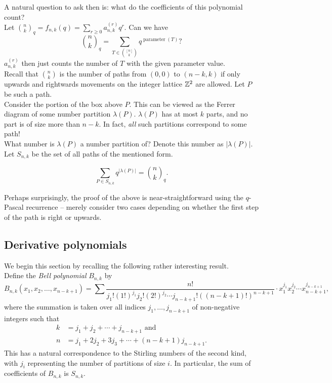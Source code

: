 	A natural question to ask then is: what do the coefficients of this polynomial count?\\
	Let $\binom{n}{k}_q = f_{n,k}(q) = \sum_{r \ge 0} a_{n,k}^{(r)} q^r$.
	Can we have
	\[ \binom{n}{k}_q = \sum_{T \in \binom{[n]}{k}} q^{\operatorname{parameter}(T)}? \]
	$a_{n,k}^{(r)}$ then just counts the number of $T$ with the given parameter value.\\
	Recall that $\binom{n}{k}$ is the number of paths from $(0,0)$ to $(n-k,k)$ if only upwards and rightwards movements on the integer lattice $\mathbb{Z}^2$ are allowed. Let $P$ be such a path.\\
	Consider the portion of the box above $P$. This can be viewed as the Ferrer diagram of some number partition $\lambda(P)$. $\lambda(P)$ has at most $k$ parts, and no part is of size more than $n-k$. In fact, \emph{all} such partitions correspond to some path!\\
	What number is $\lambda(P)$ a number partition of? Denote this number as $|\lambda(P)|$. Let $S_{n,k}$ be the set of all paths of the mentioned form. 

	\begin{ftheo}
		\[ \sum_{P \in S_{n,k}} q^{|\lambda(P)|} = \binom{n}{k}_q. \]
	\end{ftheo}
	Perhaps surprisingly, the proof of the above is near-straightforward using the $q$-Pascal recurrence -- merely consider two cases depending on whether the first step of the path is right or upwards.

\subsection{Derivative polynomials}

	We begin this section by recalling the following rather interesting result.\\
	Define the \emph{Bell polynomial} $B_{n,k}$ by
	\[ B_{n,k}(x_1,x_2,\ldots,x_{n-k+1}) = \sum \frac{n!}{j_1! (1!)^{j_1} j_2! (2!)^{j_2} \cdots j_{n-k+1}! ((n-k+1)!)^{n-k+1}} \cdot x_1^{j_1} x_2^{j_2} \cdots x_{n-k+1}^{j_{n-k+1}}, \]
	where the summation is taken over all indices $j_1,\ldots,j_{n-k+1}$ of non-negative integers such that
	\begin{align*}
		k &= j_1 + j_2 + \cdots + j_{n-k+1} \text{ and} \\
		n &= j_1 + 2j_2 + 3j_3 + \cdots + (n-k+1)j_{n-k+1}.
	\end{align*}
	This has a natural correspondence to the Stirling numbers of the second kind, with $j_i$ representing the number of partitions of size $i$. In particular, the sum of coefficients of $B_{n,k}$ is $S_{n,k}$.

